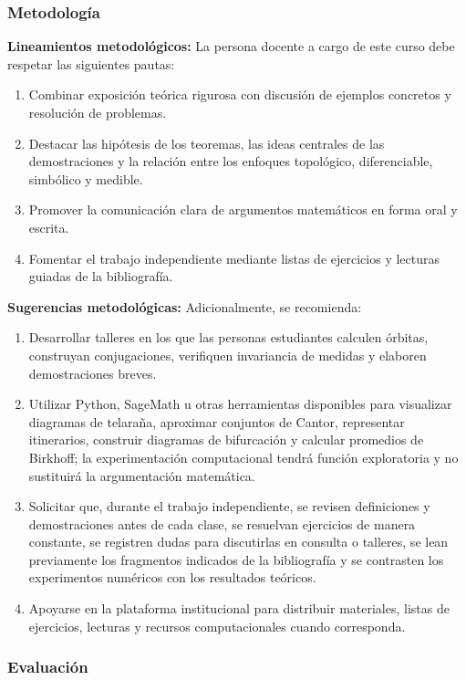 \begin{refsection}
\subsubsection*{Metodología}

\noindent\textbf{Lineamientos metodológicos:} La persona docente a cargo de este curso debe respetar las siguientes pautas:
\begin{enumerate}
    \item Combinar exposición teórica rigurosa con discusión de ejemplos concretos y resolución de problemas.
    \item Destacar las hipótesis de los teoremas, las ideas centrales de las demostraciones y la relación entre los enfoques topológico, diferenciable, simbólico y medible.
    \item Promover la comunicación clara de argumentos matemáticos en forma oral y escrita.
    \item Fomentar el trabajo independiente mediante listas de ejercicios y lecturas guiadas de la bibliografía.
\end{enumerate}

\textbf{Sugerencias metodológicas:} Adicionalmente, se recomienda:
\begin{enumerate}
    \item Desarrollar talleres en los que las personas estudiantes calculen órbitas, construyan conjugaciones, verifiquen invariancia de medidas y elaboren demostraciones breves.
    \item Utilizar Python, SageMath u otras herramientas disponibles para visualizar diagramas de telaraña, aproximar conjuntos de Cantor, representar itinerarios, construir diagramas de bifurcación y calcular promedios de Birkhoff; la experimentación computacional tendrá función exploratoria y no sustituirá la argumentación matemática.
    \item Solicitar que, durante el trabajo independiente, se revisen definiciones y demostraciones antes de cada clase, se resuelvan ejercicios de manera constante, se registren dudas para discutirlas en consulta o talleres, se lean previamente los fragmentos indicados de la bibliografía y se contrasten los experimentos numéricos con los resultados teóricos.
    \item Apoyarse en la plataforma institucional para distribuir materiales, listas de ejercicios, lecturas y recursos computacionales cuando corresponda.
\end{enumerate}

\subsubsection*{Evaluación}


\end{refsection}
